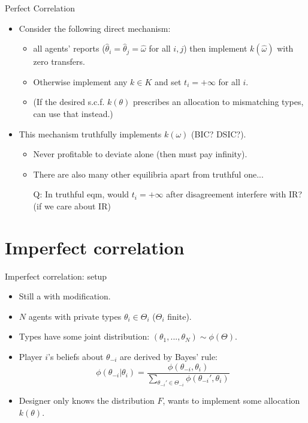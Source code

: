 \documentclass[english,10pt
,aspectratio=169
]{beamer}
\begin{document}
\begin{frame}{Perfect Correlation}
\begin{itemize}
	\item Consider the following direct mechanism:
	\begin{itemize}
		\item {} all agents' reports  ($\hat{\theta}_i=\hat{\theta}_j=\hat{\omega}$ for all $i,j$) then implement $k(\hat{\omega})$ with zero transfers.
		\item \alert{Otherwise} implement any $k \in K$ and set \alert{$t_i = +\infty$} for all $i$.
		\item (If the desired s.c.f. $k(\theta)$ prescribes an allocation to mismatching types, can use that instead.)
	\end{itemize}
	\item This mechanism truthfully implements $k(\omega)$ (BIC? DSIC?).
	\begin{itemize}
		\item Never profitable to deviate alone (then must pay infinity).
		\item There are also many other equilibria apart from truthful one...
		\item[Q:] In truthful eqm, would $t_i = +\infty$ after disagreement interfere with IR? (if we care about IR)
	\end{itemize}
\end{itemize}
\end{frame}


\section{Imperfect correlation}

\begin{frame}{Imperfect correlation: setup}
\begin{itemize}
	\item Still a  with modification.
	\item $N$ agents with private types $\theta_i \in \Theta_i$ ($\Theta_i$ finite).
	\item Types have some joint distribution: $(\theta_1,...,\theta_N) \sim \phi(\Theta)$.
	\item Player $i$'s beliefs about $\theta_{-i}$ are derived by Bayes' rule:
	$$\phi(\theta_{-i}|\theta_i) = \frac{\phi(\theta_{-i},\theta_i)}{\sum_{\theta_{-i}' \in \Theta_{-i}} \phi(\theta_{-i}',\theta_i)} $$
	\item Designer only knows the distribution $F$, wants to implement some allocation $k(\theta)$.
\end{itemize}
\end{frame}
\end{document}
